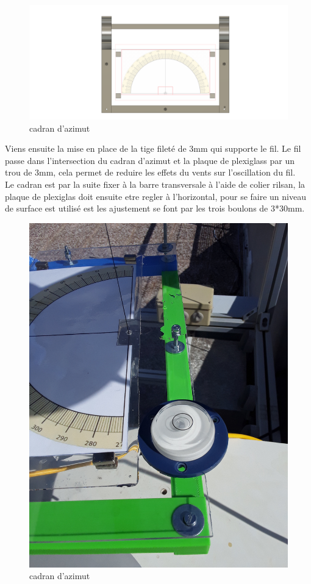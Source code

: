 \documentclass[12pt,a4paper]{article}
\begin{document}
\begin{flushleft}
\begin{figure}[H]
\centering
\includegraphics[width=12cm]{image/montage/boussole_solaire/5.png} 
\caption{cadran d'azimut}
\end{figure}


Viens ensuite la mise en place de la tige fileté de 3mm qui supporte le fil. Le fil passe dans l'intersection du cadran d'azimut et la plaque de plexiglass par un trou de 3mm, cela permet de reduire les effets du vents sur l'oscillation du fil.\\
Le cadran est par la suite fixer à la barre transversale à l'aide de colier rilsan, la plaque de plexiglas doit ensuite etre regler à l'horizontal, pour se faire un niveau de surface est utilisé est les ajustement se font par les trois boulons de 3*30mm.

\begin{figure}[H]
\centering
\includegraphics[width=12cm]{image/montage/boussole_solaire/7.jpg} 
\caption{cadran d'azimut}
\end{figure}


\end{flushleft}
\end{document}
